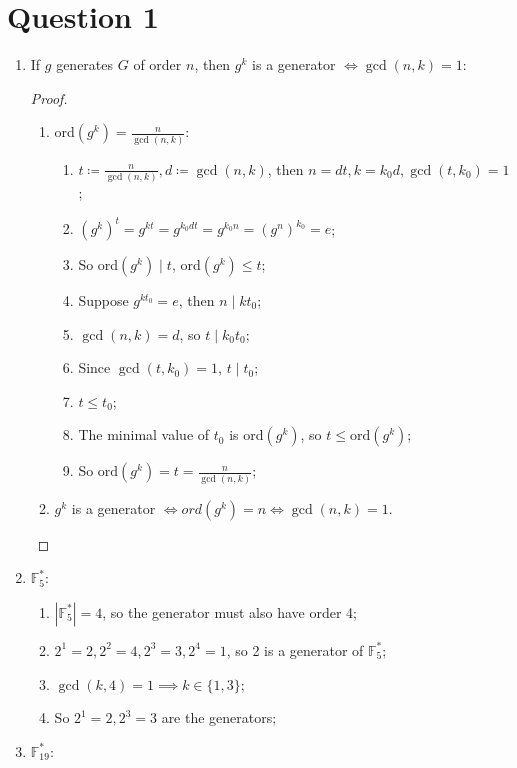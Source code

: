\documentclass{article}
\begin{document}
\section*{Question 1}

\begin{enumerate}
    \item If $g$ generates $G$ of order $n$, then $g^k$ is a generator $\iff \gcd(n,k)=1$:
    \begin{proof}
    ~
        \begin{enumerate}
            \item ord$(g^k)=\frac{n}{\gcd(n,k)}$:
            \begin{enumerate}
                \item $t\coloneqq \frac{n}{\gcd(n,k)},d\coloneqq \gcd(n,k)$, then $n=dt    ,k=k_0d,\gcd(t,k_0)=1$;
                \item $(g^k)^t=g^{kt}=g^{k_0dt}=g^{k_0n}=(g^n)^{k_0}=e$;
                \item  So ord$(g^k)\mid t$, ord$(g^k)\leq t$;
                \item Suppose $g^{kt_0}=e$, then $n\mid kt_0$;
                \item $\gcd(n,k)=d$, so $t\mid k_0t_0$;
                \item Since $\gcd(t,k_0)=1$, $t\mid t_0$;
                \item $t\leq t_0$;
                \item The minimal value of $t_0$ is ord$(g^k)$, so $t\leq\text{ord}(g^k)$;
                \item So $\text{ord}(g^k)=t=\frac{n}{\gcd(n,k)}$;
            \end{enumerate}
            \item $g^k$ is a generator $\iff ord(g^k)=n \iff \gcd(n,k)=1$.
        \end{enumerate}
    \end{proof}
    \item $\mathbb{F}^*_5$:
    \begin{enumerate}
        \item $|\mathbb{F}^*_5|=4$, so the generator must also have order 4;
        \item $2^1=2,2^2=4,2^3=3,2^4=1$, so 2 is a generator of $\mathbb{F}^*_5$;
        \item $\gcd(k,4)=1\implies k\in\{1,3\}$;
        \item So $2^1=2,2^3=3$ are the generators;
    \end{enumerate}
    \item $\mathbb{F}^*_{19}$:

\end{enumerate}
\end{document}
